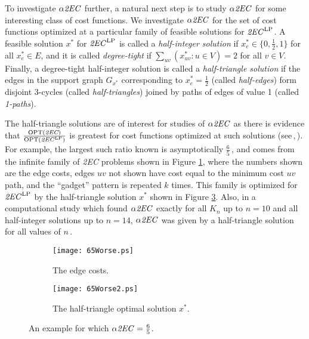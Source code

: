 \documentclass[oneeqnum,final]{siamltex1213}
\newcommand{\TwoEC}{\emph{2EC}}
\newcommand{\TwoECLP}{\ensuremath{\text{\TwoEC}^{\text{LP}}}}
\newcommand{\alphaTwoEC}{\ensuremath{\alpha\text{\TwoEC}}}
\newcommand{\Kn}{\ensuremath{K_{n}}}
\newcommand{\Gx}{\ensuremath{G_{x^{*}}}}
\begin{document}
To investigate \alphaTwoEC{} further, a natural next step is to study $\alphaTwoEC$ for some interesting class of cost functions. We investigate \alphaTwoEC{} for the set of cost functions optimized at a particular family of feasible solutions for \TwoECLP. A feasible solution $x^{*}$ for \TwoECLP{} is called a \emph{half-integer solution} if $x^{*}_{e}\in\{0, \frac{1}{2}, 1\}$ for all $x^{*}_e\in E$, and it is called \emph{degree-tight} if $\sum_{uv}(x^{*}_{uv}:u\in V)=2$ for all $v\in V$. Finally, a degree-tight half-integer solution is called a \emph{half-triangle solution} if the edges in the support graph \Gx{} corresponding to $x^{*}_{e}=\frac{1}{2}$ (called \emph{half-edges}) form disjoint 3-cycles (called \emph{half-triangles}) joined by paths of edges of value 1 (called \emph{\mbox{1-paths}}).

The half-triangle solutions are of interest for studies of \alphaTwoEC{} as there is \mbox{evidence} that $\frac{\text{OPT}(\TwoEC)}{\text{OPT}(\TwoECLP)}$ is greatest for cost functions optimized at such solutions (see\,\cite{alexander},\,\cite{carr}). For example, the largest such ratio known is asymptotically $\frac{6}{5}$\,\cite{alexander}, and comes from the infinite family of \TwoEC{} problems shown in Figure \ref{65WorseCaseExample}, where the numbers shown are the edge costs, edges $uv$ not shown have cost equal to the minimum cost $uv$ path, and the ``gadget'' pattern is repeated $k$ times. This family is optimized for \TwoECLP{} by the half-triangle solution $x^{*}$ shown in Figure \ref{65WorseCaseExample2}. Also, in a computational study which found \alphaTwoEC{} exactly for all \Kn{} up to $n=10$ and all half-integer solutions up to $n=14$, \alphaTwoEC{} was given by a half-triangle solution for all values of $n$\,\cite{alexander}.

\begin{figure}
	\centering
	\begin{subfigure}[t]{0.45\textwidth}
		\vskip 0pt
		\centering
		\texttt{[image: 65Worse.ps]}
		\caption{The edge costs.}\label{65WorseCaseExample}
	\end{subfigure}
	\hfill
	\begin{subfigure}[t]{0.45\textwidth}
		\vskip 0pt
		\centering
		\texttt{[image: 65Worse2.ps]}
\caption{The half-triangle optimal solution $x^{*}$.}\label{65WorseCaseExample2}
	\end{subfigure}
	\caption{An example for which $\alphaTwoEC=\frac{6}{5}$\cite{alexander}.}
\end{figure}
\end{document}
